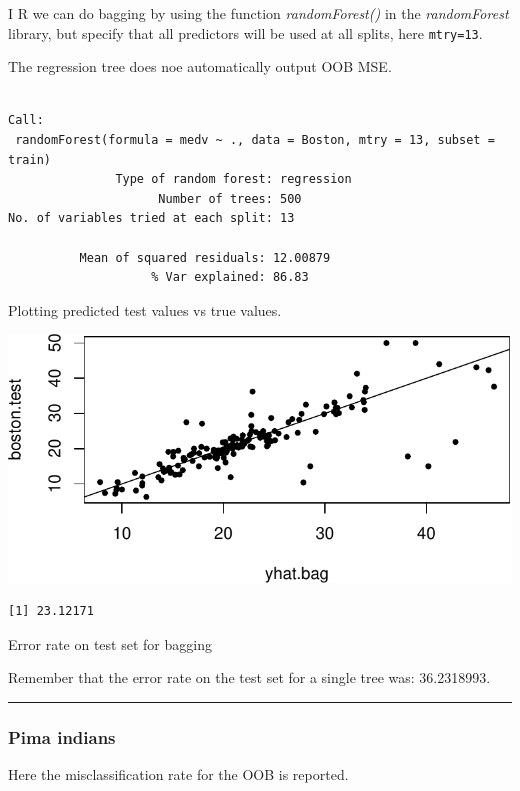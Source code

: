 \documentclass[
  letterpaper,
  DIV=11,
  numbers=noendperiod]{scrartcl}
\begin{document}
I R we can do bagging by using the function \emph{randomForest()} in the
\emph{randomForest} library, but specify that all predictors will be
used at all splits, here \texttt{mtry=13}.

The regression tree does noe automatically output OOB MSE.

\begin{verbatim}

Call:
 randomForest(formula = medv ~ ., data = Boston, mtry = 13, subset = train) 
               Type of random forest: regression
                     Number of trees: 500
No. of variables tried at each split: 13

          Mean of squared residuals: 12.00879
                    % Var explained: 86.83
\end{verbatim}

Plotting predicted test values vs true values.

\includegraphics{L13_files/figure-pdf/unnamed-chunk-18-1.pdf}

\begin{verbatim}
[1] 23.12171
\end{verbatim}

Error rate on test set for bagging

Remember that the error rate on the test set for a single tree was:
36.2318993.

\begin{center}\rule{0.5\linewidth}{0.5pt}\end{center}

\hypertarget{pima-indians}{%
\subsubsection{Pima indians}\label{pima-indians}}

Here the misclassification rate for the OOB is reported.
\end{document}
